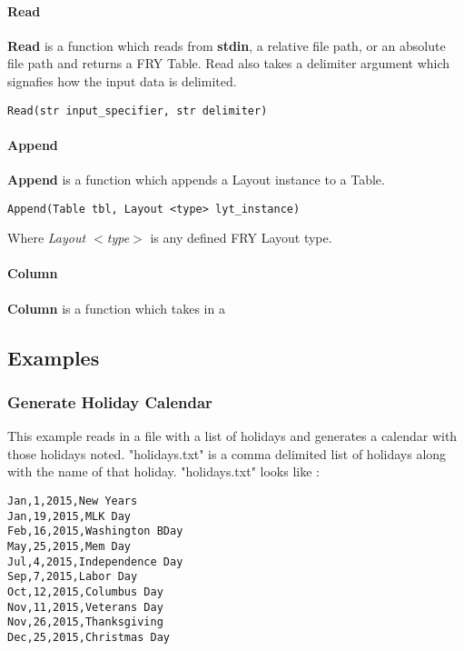 \documentclass{article}
\begin{document}
\paragraph{Read}
\textbf{Read} is a function which reads from \textbf{stdin}, a relative file path, or an absolute file path and returns a FRY Table. Read also takes a delimiter argument which signafies how the input data is delimited.
\begin{lstlisting}
Read(str input_specifier, str delimiter)
\end{lstlisting}

\paragraph{Append}
\textbf{Append} is a function which appends a Layout instance to a Table.
\begin{lstlisting}
Append(Table tbl, Layout <type> lyt_instance)
\end{lstlisting}
Where \emph{Layout $<$type$>$} is any defined FRY Layout type.

\paragraph{Column}
\textbf{Column} is a function which takes in a 

\subsection{Examples}
\subsubsection{Generate Holiday Calendar}
\label{sec:cal_example}
This example reads in a file with a list of holidays and generates a calendar with those holidays noted. "holidays.txt" is a comma delimited list of holidays along with the name of that holiday. "holidays.txt" looks like :
\begin{lstlisting}
Jan,1,2015,New Years
Jan,19,2015,MLK Day
Feb,16,2015,Washington BDay
May,25,2015,Mem Day
Jul,4,2015,Independence Day
Sep,7,2015,Labor Day
Oct,12,2015,Columbus Day
Nov,11,2015,Veterans Day
Nov,26,2015,Thanksgiving
Dec,25,2015,Christmas Day
\end{lstlisting}
\end{document}
